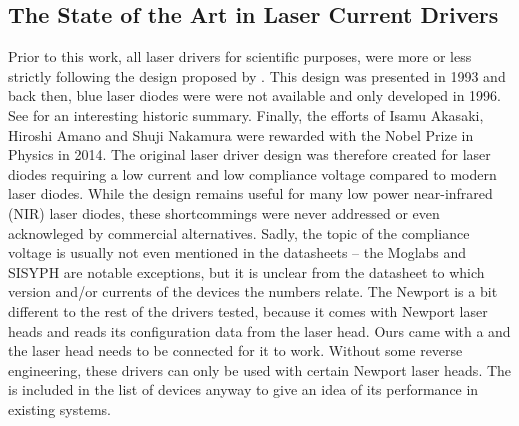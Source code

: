 \subsection{The State of the Art in Laser Current Drivers}
Prior to this work, all laser drivers for scientific purposes, were more or less strictly following the design proposed by \citeauthor{libbrecht_hall} \cite{libbrecht_hall}. This design was presented in 1993 and back then, blue laser diodes were were not available and only developed in 1996. See \cite{blue_laser_diodes_history} for an interesting historic summary. Finally, the efforts of Isamu Akasaki, Hiroshi Amano and Shuji Nakamura were rewarded with the Nobel Prize in Physics in 2014. The original laser driver design was therefore created for laser diodes requiring a low current and low compliance voltage compared to modern laser diodes. While the design remains useful for many low power near-infrared (NIR) laser diodes, these shortcommings were never addressed or even acknowleged by commercial alternatives. Sadly, the topic of the compliance voltage is usually not even mentioned in the datasheets -- the Moglabs  and SISYPH  are notable exceptions, but it is unclear from the datasheet to which version and/or currents of the devices the numbers relate. The Newport  is a bit different to the rest of the drivers tested, because it comes with Newport laser heads and reads its configuration data from the laser head. Ours came with a  and the laser head needs to be connected for it to work. Without some reverse engineering, these drivers can only be used with certain Newport laser heads. The  is included in the list of devices anyway to give an idea of its performance in existing systems.

